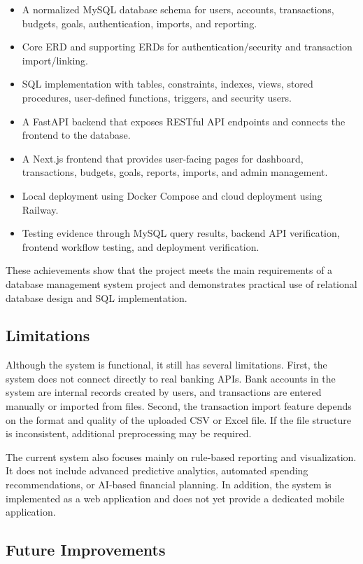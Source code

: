 \documentclass{article}
\begin{document}
\begin{itemize}
    \item A normalized MySQL database schema for users, accounts, transactions, budgets, goals, authentication, imports, and reporting.
    \item Core ERD and supporting ERDs for authentication/security and transaction import/linking.
    \item SQL implementation with tables, constraints, indexes, views, stored procedures, user-defined functions, triggers, and security users.
    \item A FastAPI backend that exposes RESTful API endpoints and connects the frontend to the database.
    \item A Next.js frontend that provides user-facing pages for dashboard, transactions, budgets, goals, reports, imports, and admin management.
    \item Local deployment using Docker Compose and cloud deployment using Railway.
    \item Testing evidence through MySQL query results, backend API verification, frontend workflow testing, and deployment verification.
\end{itemize}

These achievements show that the project meets the main requirements of a database management system project and demonstrates practical use of relational database design and SQL implementation.

\subsection{Limitations}

Although the system is functional, it still has several limitations. First, the system does not connect directly to real banking APIs. Bank accounts in the system are internal records created by users, and transactions are entered manually or imported from files. Second, the transaction import feature depends on the format and quality of the uploaded CSV or Excel file. If the file structure is inconsistent, additional preprocessing may be required.

The current system also focuses mainly on rule-based reporting and visualization. It does not include advanced predictive analytics, automated spending recommendations, or AI-based financial planning. In addition, the system is implemented as a web application and does not yet provide a dedicated mobile application.

\subsection{Future Improvements}
\end{document}
